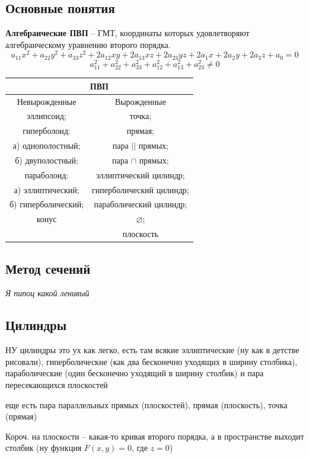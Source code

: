 \documentclass{article}
\begin{document}
\subsection{Основные понятия}
\textbf{Алгебраические ПВП} -- ГМТ, координаты которых удовлетворяют алгебраическому уравнению второго порядка.
$$ a_{11}x^2+a_{22}y^2+a_{33}z^2+2a_{12}xy+2a_{13}xz+2a_{23}yz+2a_1x+2a_2y+2a_3z+a_0=0 $$
$$a_{11}^2+a_{22}^2+a_{33}^2+a_{12}^2+a_{13}^2+a_{23}^2\neq0$$
\begin{center}
    \begin{tabular}{|c|c|}
        \hline
        \multicolumn{2}{|c|}{ПВП} \\
        \hline
         Невырожденные & Вырожденные \\
         \hline
         эллипсоид; & точка; \\
         гиперболоид: & прямая; \\
         а) однополостный; & пара $||$ прямых; \\
         б) двуполостный; & пара $\cap$ прямых; \\
         параболоид: & эллиптический цилиндр; \\
         а) эллиптический; & гиперболический цилиндр; \\
         б) гиперболический; & параболический цилиндр; \\
         конус & $\varnothing$; \\
         & плоскость \\
          \hline
    \end{tabular}
\end{center}
\subsection{Метод сечений}

\textit{Я пипоц какой ленивый}
\newpage

\subsection{Цилиндры}
НУ цилиндры это ух как легко, есть там всякие эллиптические (ну как в детстве рисовали), гиперболические (как два бесконечно уходящих в ширину столбика), параболические (один бесконечно уходящий в ширину столбик) и пара пересекающихся плоскостей

еще есть пара параллельных прямых (плоскостей), прямая (плоскость), точка (прямая)

Короч. на плоскости -- какая-то кривая второго порядка, а в пространстве выходит столбик (ну функция $F(x,y)=0$, где $z=0$)
\end{document}
